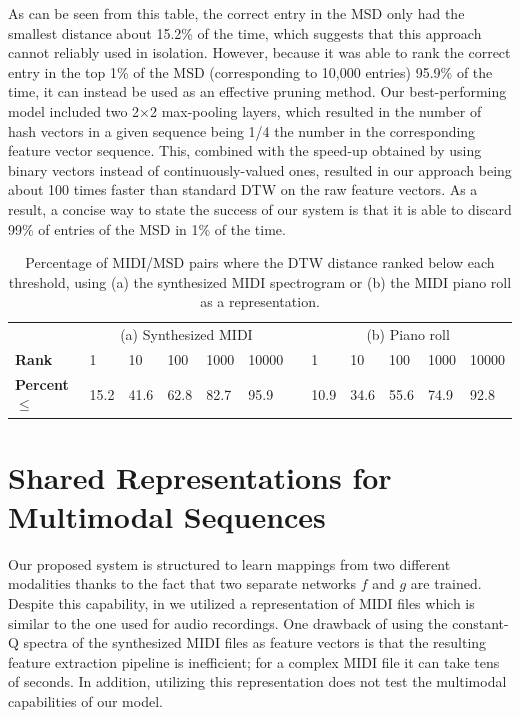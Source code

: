 \documentclass{article} %
\begin{document}
As can be seen from this table, the correct entry in the MSD only had the smallest distance about 15.2\% of the time, which suggests that this approach cannot reliably used in isolation.
However, because it was able to rank the correct entry in the top 1\% of the MSD (corresponding to 10,000 entries) 95.9\% of the time, it can instead be used as an effective pruning method.
Our best-performing model included two 2$\times$2 max-pooling layers, which resulted in the number of hash vectors in a given sequence being 1/4 the number in the corresponding feature vector sequence.
This, combined with the speed-up obtained by using binary vectors instead of continuously-valued ones, resulted in our approach being about 100 times faster than standard DTW on the raw feature vectors.
As a result, a concise way to state the success of our system is that it is able to discard 99\% of entries of the MSD in 1\% of the time.

\begin{table}
  \begin{center}
    \begin{tabular}{l l l l l l l l l l l l}
      \toprule
      & \multicolumn{5}{c}{(a) Synthesized MIDI} & &  \multicolumn{5}{c}{(b) Piano roll} \\
      \cmidrule{2-6}
      \cmidrule{8-12}
      \textbf{Rank} & 1 & 10 & 100 & 1000 & 10000 & & 1 & 10 & 100 & 1000 & 10000 \\
      \textbf{Percent $\le$} & 15.2 & 41.6 & 62.8 & 82.7 & 95.9 & & 10.9 & 34.6 & 55.6 & 74.9 & 92.8 \\
      \bottomrule
    \end{tabular}
  \end{center}
  \caption{Percentage of MIDI/MSD pairs where the DTW distance ranked below each threshold, using (a) the synthesized MIDI spectrogram or (b) the MIDI piano roll as a representation.}
  \label{tab:rank-percentages}
\end{table}

\section{Shared Representations for Multimodal Sequences}
\label{sec:multimodal}

Our proposed system is structured to learn mappings from two different modalities thanks to the fact that two separate networks $f$ and $g$ are trained.
Despite this capability, in \cite{raffel2015large} we utilized a representation of MIDI files which is similar to the one used for audio recordings.
One drawback of using the constant-Q spectra of the synthesized MIDI files as feature vectors is that the resulting feature extraction pipeline is inefficient; for a complex MIDI file it can take tens of seconds.
In addition, utilizing this representation does not test the multimodal capabilities of our model.
\end{document}
